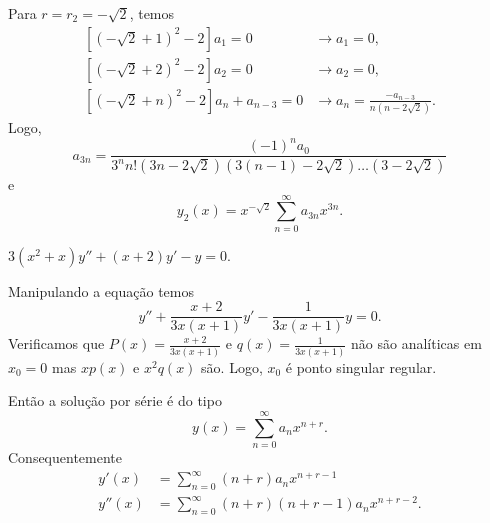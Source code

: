 \documentclass[a4paper,12pt, leqno, answers]{exam}
\begin{document}
\begin{questions}
\begin{solution}
        Para $r = r_2 = -\sqrt{2}$, temos
        \begin{align*}
            \left[ \left( -\sqrt{2} + 1 \right)^2 - 2 \right] a_1 = 0 &\rightarrow a_1 = 0, \\
            \left[ \left( -\sqrt{2} + 2 \right)^2 - 2 \right] a_2 = 0 &\rightarrow a_2 = 0, \\
            \left[ \left( -\sqrt{2} + n \right)^2 - 2 \right] a_n + a_{n - 3} = 0 &\rightarrow a_n = \frac{- a_{n - 3}}{n \left( n - 2 \sqrt{2} \right)}.
        \end{align*}
        Logo,
        \[
        a_{3n} = \frac{\left( -1 \right)^n a_0}{3^n n! \left( 3n - 2\sqrt{2} \right) \left( 3\left( n - 1 \right) - 2\sqrt{2} \right) \ldots \left( 3 - 2\sqrt{2} \right)}
        \]
        e
        \[
        y_2(x) = x^{-\sqrt{2}} \sum_{n = 0}^\infty a_{3n} x^{3n}.
        \]
    \end{solution}

    \question $3 \left( x^2 + x \right) y'' + \left( x + 2 \right) y' - y = 0$.
    \begin{solution}
        Manipulando a equa\c{c}\~{a}o temos
        \[
        y'' + \frac{x + 2}{3 x \left( x + 1 \right)} y' - \frac{1}{3x \left( x + 1 \right)} y = 0.
        \]
        Verificamos que $P(x) = \frac{x + 2}{3 x \left( x + 1 \right)}$ e $q(x) = \frac{1}{3x \left( x + 1 \right)}$ n\~{a}o s\~{a}o anal\'{i}ticas em $x_0 = 0$ mas $x p(x)$ e $x^2 q(x)$ s\~{a}o. Logo, $x_0$ \'{e} ponto singular regular.

        Ent\~{a}o a solu\c{c}\~{a}o por s\'{e}rie \'{e} do tipo
        \[
        y\left( x \right) = \sum_{n = 0}^\infty a_n x^{n + r}.
        \]
        Consequentemente
        \begin{align*}
            y'(x) &= \sum_{n = 0}^\infty \left( n + r \right) a_n x^{n + r - 1} \\
            y''(x) &= \sum_{n = 0}^\infty \left( n + r \right) \left( n + r - 1 \right) a_n x^{n + r - 2}.
        \end{align*}


\end{solution}
\end{questions}
\end{document}
